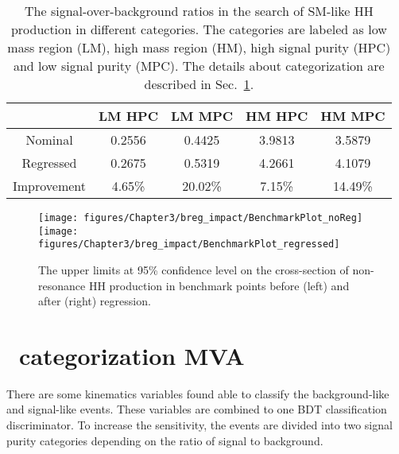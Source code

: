 \begin{table}[h]
\centering
\caption{The signal-over-background ratios in the search of SM-like HH production in different categories.
The categories are labeled as low mass region (LM), high mass region (HM), high signal purity (HPC) and low signal purity (MPC).
The details about categorization are described in Sec.~\ref{sec:catMVA}.
}
\label{tab:BregImprovement}
\begin{tabular}{|c|c|c|c|c|}
\hline
            & LM HPC & LM MPC  & HM HPC & HM MPC  \\ \hline
Nominal		& 0.2556 & 0.4425  & 3.9813 & 3.5879  \\ \hline
Regressed	& 0.2675 & 0.5319  & 4.2661 & 4.1079  \\ \hline
Improvement & 4.65\% & 20.02\% & 7.15\% & 14.49\% \\ \hline
\end{tabular}
\end{table}

\begin{figure}[h]
  \centering
  \texttt{[image: figures/Chapter3/breg\_impact/BenchmarkPlot\_noReg]}\hfil
  \texttt{[image: figures/Chapter3/breg\_impact/BenchmarkPlot\_regressed]}\hfil
  \caption{The upper limits at 95\% confidence level on the cross-section of non-resonance HH production in benchmark points before (left) and after (right) regression.}
  \label{fig:RegLimit}
\end{figure}


\section{\HHbbgg~categorization MVA}\label{sec:catMVA}

There are some kinematics variables found able to classify the background-like and signal-like events.
These variables are combined to one BDT classification discriminator.
To increase the sensitivity, the events are divided into two signal purity categories depending on the ratio of signal to background.

